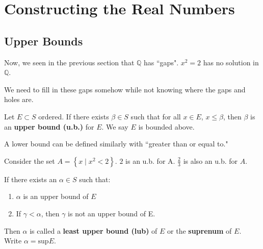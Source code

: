 \documentclass[../main.tex]{subfiles}
\begin{document}
\section{Constructing the Real Numbers}


\subsection{Upper Bounds}

Now, we seen in the previous section that \( \mathbb{Q} \) has ``gaps".
\( x^2 = 2 \) has no solution in \( \mathbb{Q} \).
\vspace{5mm}
\begin{center}
\end{center}

We need to fill in these gaps somehow while not knowing where the gaps and holes are.

\begin{definition}
    Let \( E \subset S \) ordered.
    If there exists \( \beta \in S \) such that for all \( x \in E \), \( x \leq \beta \),
    then \( \beta \) is an \textbf{upper bound (u.b.)} for \( E \).
    We say \( E \) is bounded above.
\end{definition}

A lower bound can be defined similarly with ``greater than or equal to."

\begin{example}[]
    Consider the set \( A = \left\{ x \mid x^2 < 2 \right\} \). \( 2 \) is an u.b. for A.
    \( \displaystyle \frac{2}{3} \) is also an u.b. for \( A \).
\end{example}

\begin{definition}
    If there exists an \( \alpha \in S \) such that:
    \begin{enumerate}
        \item \( \alpha \) is an upper bound of \( E \)
        \item If \( \gamma < \alpha \), then \( \gamma \) is not an upper bound of E.
    \end{enumerate}
    Then \( \alpha \) is called a \textbf{least upper bound (lub)} of \( E \) or the \textbf{suprenum} of \( E \).
    Write \( \alpha = \text{sup} E \).
\end{definition}
\end{document}
